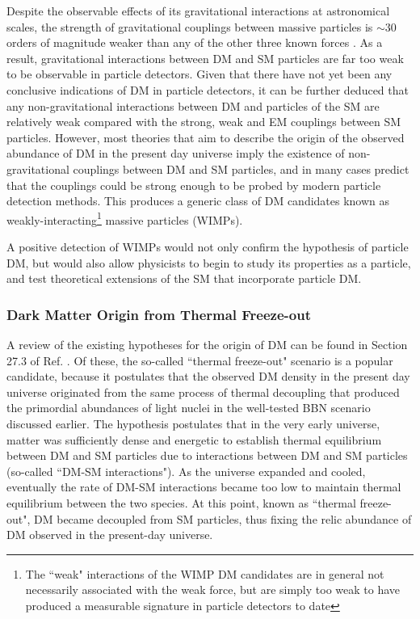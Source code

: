 Despite the observable effects of its gravitational interactions at astronomical scales, the strength of gravitational couplings between massive particles is \(\sim30\) orders of magnitude weaker than any of the other three known forces \cite{griffiths_2008}. As a result, gravitational interactions between DM and SM particles are far too weak to be observable in particle detectors. Given that there have not yet been any conclusive indications of DM in particle detectors, it can be further deduced that any non-gravitational interactions between DM and particles of the SM are relatively weak compared with the strong, weak and EM couplings between SM particles. However, most theories that aim to describe the origin of the observed abundance of DM in the present day universe imply the existence of non-gravitational couplings between DM and SM particles, and in many cases predict that the couplings could be strong enough to be probed by modern particle detection methods. This produces a generic class of DM candidates known as weakly-interacting\footnote{The ``weak" interactions of the WIMP DM candidates are in general not necessarily associated with the weak force, but are simply too weak to have produced a measurable signature in particle detectors to date} massive particles (WIMPs). 

A positive detection of WIMPs would not only confirm the hypothesis of particle DM, but would also allow physicists to begin to study its properties as a particle, and test theoretical extensions of the SM that incorporate particle DM.

\subsubsection{Dark Matter Origin from Thermal Freeze-out}

A review of the existing hypotheses for the origin of DM can be found in Section 27.3 of Ref. \cite{pdg_2020}. Of these, the so-called ``thermal freeze-out" scenario is a popular candidate, because it postulates that the observed DM density in the present day universe originated from the same process of thermal decoupling that produced the primordial abundances of light nuclei in the well-tested BBN scenario discussed earlier. The hypothesis postulates that in the very early universe, matter was sufficiently dense and energetic to establish thermal equilibrium between DM and SM particles due to interactions between DM and SM particles (so-called ``DM-SM interactions"). As the universe expanded and cooled, eventually the rate of DM-SM interactions became too low to maintain thermal equilibrium between the two species. At this point, known as ``thermal freeze-out", DM became decoupled from SM particles, thus fixing the relic abundance of DM observed in the present-day universe. 

